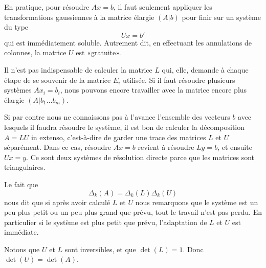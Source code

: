 \begin{normaltext}
	En pratique, pour résoudre \( Ax=b\), il faut seulement appliquer les transformations gaussiennes à la matrice élargie \( (A|b)\) pour finir sur un système du type
	\begin{equation}
		Ux=b'
	\end{equation}
	qui est immédiatement soluble. Autrement dit, en effectuant les annulations de colonnes, la matrice \( U\) est «gratuite».

	Il n'est pas indispensable de calculer la matrice \( L\) qui, elle, demande à chaque étape de se souvenir de la matrice \( E_i\) utilisée. Si il faut résoudre plusieurs systèmes \( Ax_i=b_i\), nous pouvons encore travailler avec la matrice encore plus élargie \( (A|b_1\ldots b_m)\).

	Si par contre nous ne connaissons pas à l'avance l'ensemble des vecteurs \( b\) avec lesquels il faudra résoudre le système, il est bon de calculer la décomposition \( A=LU \) in extenso, c'est-à-dire de garder une trace des matrices \( L\) et \( U\) séparément. Dans ce cas, résoudre \( Ax=b\) revient à résoudre \( Ly=b\), et ensuite \( Ux=y\). Ce sont deux systèmes de résolution directe parce que les matrices sont triangulaires.
\end{normaltext}

\begin{normaltext}
	Le fait que
	\begin{equation}
		\Delta_k(A)=\Delta_k(L)\Delta_k(U)
	\end{equation}
	nous dit que si après avoir calculé \( L\) et \( U \) nous remarquons que le système est un peu plus petit ou un peu plus grand que prévu, tout le travail n'est pas perdu. En particulier si le système est plus petit que prévu, l'adaptation de \( L\) et \( U\) est immédiate.
\end{normaltext}

Notons que \( U\) et \( L\) sont inversibles, et que \( \det(L)=1\). Donc \( \det(U)=\det(A)\).

